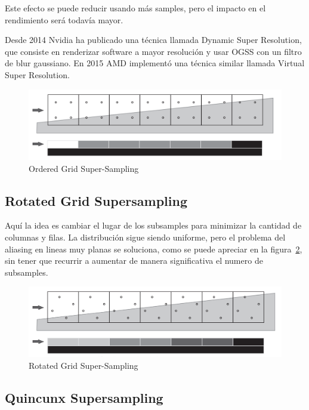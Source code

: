 \documentclass[withindex, glossary]{cam-thesis}
\begin{document}
Este efecto se puede reducir usando más samples, pero el impacto en el rendimiento será todavía mayor.

Desde 2014 Nvidia ha publicado una técnica llamada Dynamic Super Resolution\cite{960}, que consiste en renderizar software a mayor resolución y usar OGSS con un filtro de blur gaussiano. En 2015 AMD implementó una técnica similar llamada Virtual Super Resolution.

\begin{figure}[!htb]
    \includegraphics[width=\linewidth]{figures/ogss.png}
    \caption{Ordered Grid Super-Sampling\cite{Beets2000SupersamplingAA}}
    \label{ogss}
\end{figure}

\subsection{Rotated Grid Supersampling}

Aquí la idea es cambiar el lugar de los subsamples para minimizar la cantidad de columnas y filas. La distribución sigue siendo uniforme, pero el problema del aliasing en lineas muy planas se soluciona, como se puede apreciar en la figura~\ref{rgss}, sin tener que recurrir a aumentar de manera significativa el numero de subsamples.

\begin{figure}[!htb]
    \includegraphics[width=\linewidth]{figures/rgss.png}
    \caption{Rotated Grid Super-Sampling\cite{Beets2000SupersamplingAA}}
    \label{rgss}
\end{figure}

\subsection{Quincunx Supersampling}
\end{document}
